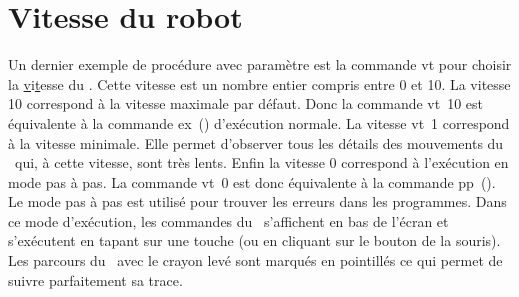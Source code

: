 \section{Vitesse du robot}

Un dernier exemple de procédure avec paramètre est la commande {\idt vt} pour choisir
la \underline{v}i\underline{t}esse du \robot. Cette vitesse est un nombre entier compris entre
0 et 10. La vitesse 10 correspond à la vitesse maximale par défaut. Donc la commande {\idt vt\ 10}
est équivalente à la commande {\idt ex\ ()} d'exécution normale. La vitesse
{\idt vt\ 1} correspond à la vitesse minimale. Elle permet d'observer tous les détails des
mouvements du \robot\ qui, à cette vitesse, sont très lents. Enfin la vitesse  0
correspond à l'exécution en mode pas à pas. La commande {\idt vt\ 0} est donc équivalente
à la commande {\idt pp\ ()}. Le mode pas à pas est utilisé pour trouver les erreurs dans les
programmes. Dans ce mode d'exécution, les commandes du \robot\ s'affichent en bas de l'écran
et s'exécutent en tapant sur une touche (ou en cliquant sur le bouton de la souris). Les parcours
du \robot\ avec le crayon levé sont marqués en pointillés ce qui permet de suivre 
parfaitement sa trace.

